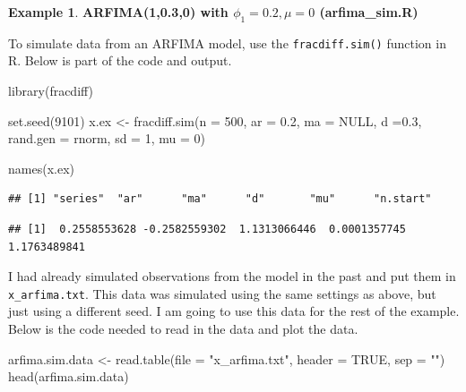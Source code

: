 \documentclass[
]{book}
\newenvironment{Shaded}{\begin{snugshade}}{\end{snugshade}}
\newcommand{\AttributeTok}[1]{\textcolor[rgb]{0.77,0.63,0.00}{#1}}
\newcommand{\ConstantTok}[1]{\textcolor[rgb]{0.00,0.00,0.00}{#1}}
\newcommand{\DecValTok}[1]{\textcolor[rgb]{0.00,0.00,0.81}{#1}}
\newcommand{\FloatTok}[1]{\textcolor[rgb]{0.00,0.00,0.81}{#1}}
\newcommand{\FunctionTok}[1]{\textcolor[rgb]{0.00,0.00,0.00}{#1}}
\newcommand{\NormalTok}[1]{#1}
\newcommand{\OtherTok}[1]{\textcolor[rgb]{0.56,0.35,0.01}{#1}}
\newcommand{\SpecialCharTok}[1]{\textcolor[rgb]{0.00,0.00,0.00}{#1}}
\newcommand{\StringTok}[1]{\textcolor[rgb]{0.31,0.60,0.02}{#1}}
\theoremstyle{definition}
\theoremstyle{definition}
\newtheorem{example}{Example}[chapter]
\theoremstyle{definition}
\theoremstyle{definition}
\theoremstyle{remark}
\begin{document}
\begin{example}

\textbf{ARFIMA(1,0.3,0) with \(\phi_1=0.2, \mu=0\) (arfima\_sim.R)}

To simulate data from an ARFIMA model, use the \texttt{fracdiff.sim()} function in R. Below is part of the code and output.

\begin{Shaded}
\begin{Highlighting}[]
\FunctionTok{library}\NormalTok{(fracdiff)}

\FunctionTok{set.seed}\NormalTok{(}\DecValTok{9101}\NormalTok{)}
\NormalTok{x.ex }\OtherTok{\textless{}{-}} \FunctionTok{fracdiff.sim}\NormalTok{(}\AttributeTok{n =} \DecValTok{500}\NormalTok{, }\AttributeTok{ar =} \FloatTok{0.2}\NormalTok{, }\AttributeTok{ma =} \ConstantTok{NULL}\NormalTok{, }\AttributeTok{d =}\FloatTok{0.3}\NormalTok{, }\AttributeTok{rand.gen =}\NormalTok{ rnorm, }\AttributeTok{sd =} \DecValTok{1}\NormalTok{, }\AttributeTok{mu =} \DecValTok{0}\NormalTok{)}

\FunctionTok{names}\NormalTok{(x.ex)}
\end{Highlighting}
\end{Shaded}

\begin{verbatim}
## [1] "series"  "ar"      "ma"      "d"       "mu"      "n.start"
\end{verbatim}

\begin{Shaded}
\end{Shaded}

\begin{verbatim}
## [1]  0.2558553628 -0.2582559302  1.1313066446  0.0001357745  1.1763489841
\end{verbatim}

I had already simulated observations from the model in the past and put them in \texttt{x\_arfima.txt}. This data was simulated using the same settings as above, but just using a different seed. I am going to use this data for the rest of the example. Below is the code needed to read in the data and plot the data.

\begin{Shaded}
\begin{Highlighting}[]
\NormalTok{arfima.sim.data }\OtherTok{\textless{}{-}} \FunctionTok{read.table}\NormalTok{(}\AttributeTok{file =} \StringTok{"x\_arfima.txt"}\NormalTok{, }
    \AttributeTok{header =} \ConstantTok{TRUE}\NormalTok{, }\AttributeTok{sep =} \StringTok{""}\NormalTok{)}
\FunctionTok{head}\NormalTok{(arfima.sim.data)}
\end{Highlighting}
\end{Shaded}


\end{example}
\end{document}
